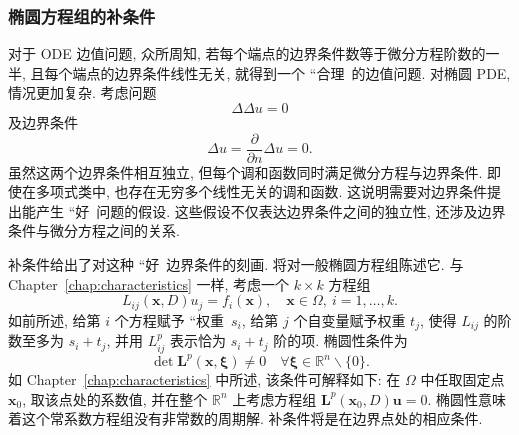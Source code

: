 \subsubsection{椭圆方程组的补条件}\label{subsec:elliptic-system-complementing-condition}

对于 ODE 边值问题, 众所周知, 若每个端点的边界条件数等于微分方程阶数的一半, 且每个端点的边界条件线性无关, 就得到一个 ``合理\textquotesingle\textquotesingle\ 的边值问题. 对椭圆 PDE, 情况更加复杂. 考虑问题
\begin{equation}\label{eq:complementing-motivation-biharmonic-equation}
\Delta\Delta u=0
\end{equation}
及边界条件
\begin{equation}\label{eq:complementing-motivation-biharmonic-boundary}
\Delta u=\frac{\partial}{\partial n}\Delta u=0.
\end{equation}
虽然这两个边界条件相互独立, 但每个调和函数同时满足微分方程与边界条件. 即使在多项式类中, 也存在无穷多个线性无关的调和函数. 这说明需要对边界条件提出能产生 ``好\textquotesingle\textquotesingle\ 问题的假设. 这些假设不仅表达边界条件之间的独立性, 还涉及边界条件与微分方程之间的关系.

补条件给出了对这种 ``好\textquotesingle\textquotesingle\ 边界条件的刻画. 将对一般椭圆方程组陈述它. 与 Chapter~\ref{chap:characteristics} 一样, 考虑一个 $k\times k$ 方程组
\begin{equation}\label{eq:weighted-elliptic-general-system}
L_{ij}(\bm{x},D)u_j=f_i(\bm{x}),\quad\bm{x}\in\Omega,\ i=1,\ldots,k.
\end{equation}
如前所述, 给第 $i$ 个方程赋予 ``权重\textquotesingle\textquotesingle\ $s_i$, 给第 $j$ 个自变量赋予权重 $t_j$, 使得 $L_{ij}$ 的阶数至多为 $s_i+t_j$, 并用 $L_{ij}^p$ 表示恰为 $s_i+t_j$ 阶的项. 椭圆性条件为
\begin{equation}\label{eq:weighted-elliptic-system-principal-determinant}
\det\bm{L}^p(\bm{x},\bm{\xi})\ne0\quad\forall\bm{\xi}\in\mathbb{R}^n\backslash\{0\}.
\end{equation}
如 Chapter~\ref{chap:characteristics} 中所述, 该条件可解释如下: 在 $\Omega$ 中任取固定点 $\bm{x}_0$, 取该点处的系数值, 并在整个 $\mathbb{R}^n$ 上考虑方程组 $\bm{L}^p(\bm{x}_0,D)\bm{u}=0$. 椭圆性意味着这个常系数方程组没有非常数的周期解. 补条件将是在边界点处的相应条件.


